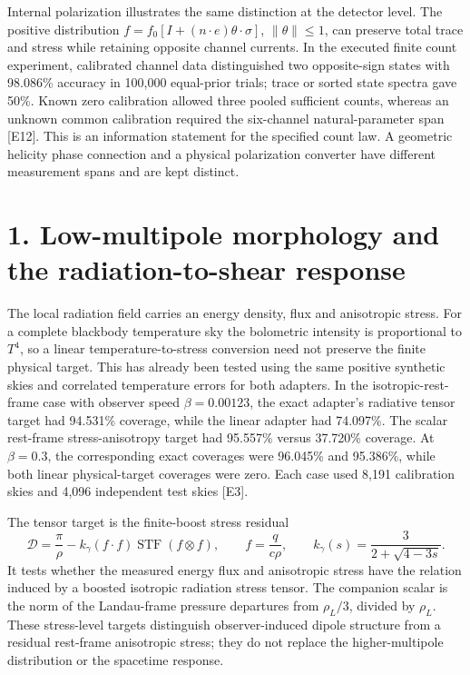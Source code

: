 \documentclass[
  10pt,
]{article}
\begin{document}
Internal polarization illustrates the same distinction at the detector
level. The positive distribution
\(f=f_0[I+(n\cdot e)\theta\cdot\sigma]\), \(\|\theta\|\le1\), can
preserve total trace and stress while retaining opposite channel
currents. In the executed finite count experiment, calibrated channel
data distinguished two opposite-sign states with 98.086\% accuracy in
100,000 equal-prior trials; trace or sorted state spectra gave 50\%.
Known zero calibration allowed three pooled sufficient counts, whereas
an unknown common calibration required the six-channel natural-parameter
span {[}E12{]}. This is an information statement for the specified count
law. A geometric helicity phase connection and a physical polarization
converter have different measurement spans and are kept distinct.

\hypertarget{low-multipole-morphology-and-the-radiation-to-shear-response}{%
\section{1. Low-multipole morphology and the radiation-to-shear
response}\label{low-multipole-morphology-and-the-radiation-to-shear-response}}

The local radiation field carries an energy density, flux and
anisotropic stress. For a complete blackbody temperature sky the
bolometric intensity is proportional to \(T^4\), so a linear
temperature-to-stress conversion need not preserve the finite physical
target. This has already been tested using the same positive synthetic
skies and correlated temperature errors for both adapters. In the
isotropic-rest-frame case with observer speed \(\beta=0.00123\), the
exact adapter's radiative tensor target had 94.531\% coverage, while the
linear adapter had 74.097\%. The scalar rest-frame stress-anisotropy
target had 95.557\% versus 37.720\% coverage. At \(\beta=0.3\), the
corresponding exact coverages were 96.045\% and 95.386\%, while both
linear physical-target coverages were zero. Each case used 8,191
calibration skies and 4,096 independent test skies {[}E3{]}.

The tensor target is the finite-boost stress residual \[
\mathscr D=\frac\pi\rho-k_\gamma(f\cdot f)\operatorname{STF}(f\otimes f),
\qquad f=\frac{q}{c\rho},\qquad
k_\gamma(s)=\frac3{2+\sqrt{4-3s}}.
\] It tests whether the measured energy flux and anisotropic stress have
the relation induced by a boosted isotropic radiation stress tensor. The
companion scalar is the norm of the Landau-frame pressure departures
from \(\rho_L/3\), divided by \(\rho_L\). These stress-level targets
distinguish observer-induced dipole structure from a residual rest-frame
anisotropic stress; they do not replace the higher-multipole
distribution or the spacetime response.
\end{document}
